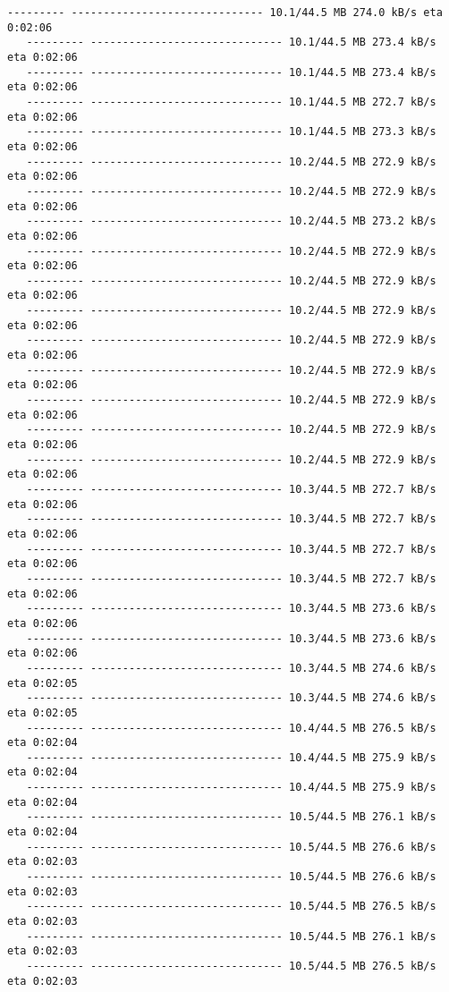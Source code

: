 \documentclass[11pt]{article}
\begin{document}
\begin{Verbatim}[commandchars=\\\{\}]
   --------- ------------------------------ 10.1/44.5 MB 274.0 kB/s eta 0:02:06
   --------- ------------------------------ 10.1/44.5 MB 273.4 kB/s eta 0:02:06
   --------- ------------------------------ 10.1/44.5 MB 273.4 kB/s eta 0:02:06
   --------- ------------------------------ 10.1/44.5 MB 272.7 kB/s eta 0:02:06
   --------- ------------------------------ 10.1/44.5 MB 273.3 kB/s eta 0:02:06
   --------- ------------------------------ 10.2/44.5 MB 272.9 kB/s eta 0:02:06
   --------- ------------------------------ 10.2/44.5 MB 272.9 kB/s eta 0:02:06
   --------- ------------------------------ 10.2/44.5 MB 273.2 kB/s eta 0:02:06
   --------- ------------------------------ 10.2/44.5 MB 272.9 kB/s eta 0:02:06
   --------- ------------------------------ 10.2/44.5 MB 272.9 kB/s eta 0:02:06
   --------- ------------------------------ 10.2/44.5 MB 272.9 kB/s eta 0:02:06
   --------- ------------------------------ 10.2/44.5 MB 272.9 kB/s eta 0:02:06
   --------- ------------------------------ 10.2/44.5 MB 272.9 kB/s eta 0:02:06
   --------- ------------------------------ 10.2/44.5 MB 272.9 kB/s eta 0:02:06
   --------- ------------------------------ 10.2/44.5 MB 272.9 kB/s eta 0:02:06
   --------- ------------------------------ 10.2/44.5 MB 272.9 kB/s eta 0:02:06
   --------- ------------------------------ 10.3/44.5 MB 272.7 kB/s eta 0:02:06
   --------- ------------------------------ 10.3/44.5 MB 272.7 kB/s eta 0:02:06
   --------- ------------------------------ 10.3/44.5 MB 272.7 kB/s eta 0:02:06
   --------- ------------------------------ 10.3/44.5 MB 272.7 kB/s eta 0:02:06
   --------- ------------------------------ 10.3/44.5 MB 273.6 kB/s eta 0:02:06
   --------- ------------------------------ 10.3/44.5 MB 273.6 kB/s eta 0:02:06
   --------- ------------------------------ 10.3/44.5 MB 274.6 kB/s eta 0:02:05
   --------- ------------------------------ 10.3/44.5 MB 274.6 kB/s eta 0:02:05
   --------- ------------------------------ 10.4/44.5 MB 276.5 kB/s eta 0:02:04
   --------- ------------------------------ 10.4/44.5 MB 275.9 kB/s eta 0:02:04
   --------- ------------------------------ 10.4/44.5 MB 275.9 kB/s eta 0:02:04
   --------- ------------------------------ 10.5/44.5 MB 276.1 kB/s eta 0:02:04
   --------- ------------------------------ 10.5/44.5 MB 276.6 kB/s eta 0:02:03
   --------- ------------------------------ 10.5/44.5 MB 276.6 kB/s eta 0:02:03
   --------- ------------------------------ 10.5/44.5 MB 276.5 kB/s eta 0:02:03
   --------- ------------------------------ 10.5/44.5 MB 276.1 kB/s eta 0:02:03
   --------- ------------------------------ 10.5/44.5 MB 276.5 kB/s eta 0:02:03

\end{Verbatim}
\end{document}
